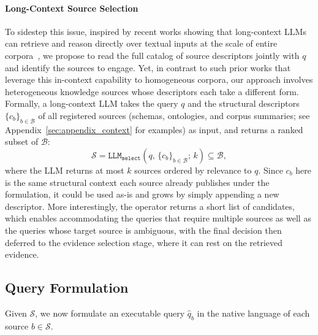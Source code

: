 \documentclass{llmxive}
\begin{document}
\paragraph{Long-Context Source Selection}
To sidestep this issue, inspired by recent works showing that long-context LLMs can retrieve and reason directly over textual inputs at the scale of entire corpora~\citep{LOFT, ToTAL}, we propose to read the full catalog of source descriptors jointly with $q$ and identify the sources to engage. Yet, in contrast to such prior works that leverage this in-context capability to homogeneous corpora, our approach involves heterogeneous knowledge sources whose descriptors each take a different form. Formally, a long-context LLM takes the query $q$ and the structural descriptors $\{c_b\}_{b \in \mathcal{B}}$ of all registered sources (schemas, ontologies, and corpus summaries; see Appendix~\ref{sec:appendix_context} for examples) as input, and returns a ranked subset of $\mathcal{B}$:
\begin{equation}
\mathcal{S} = \texttt{LLM}_{\texttt{select}}(q,\, \{c_b\}_{b \in \mathcal{B}};\, k) \subseteq \mathcal{B},
\end{equation}
where the LLM returns at most $k$ sources ordered by relevance to $q$. Since $c_b$ here is the same structural context each source already publishes under the formulation, it could be used as-is and grows by simply appending a new descriptor. More interestingly, the operator returns a short list of candidates, which enables accommodating the queries that require multiple sources as well as the queries whose target source is ambiguous, with the final decision then deferred to the evidence selection stage, where it can rest on the retrieved evidence.

\subsection{Query Formulation}

Given $\mathcal{S}$, we now formulate an executable query $\hat{q}_b$ in the native language of each source $b \in \mathcal{S}$.
\end{document}
